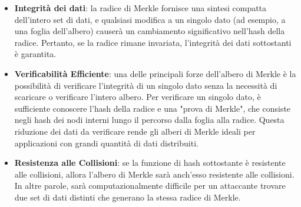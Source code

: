 \begin{itemize}
    \item \textbf{Integrità dei dati}: la radice di Merkle fornisce una sintesi compatta dell'intero set di dati, e qualsiasi modifica a un singolo dato (ad esempio, a una foglia dell'albero) causerà un cambiamento significativo nell'hash della radice. Pertanto, se la radice rimane invariata, l'integrità dei dati sottostanti è garantita.
    \item \textbf{Verificabilità Efficiente}: una delle principali forze dell'albero di Merkle è la possibilità di verificare l'integrità di un singolo dato senza la necessità di scaricare o verificare l'intero albero. Per verificare un singolo dato, è sufficiente conoscere l'hash della radice e una "prova di Merkle", che consiste negli hash dei nodi interni lungo il percorso dalla foglia alla radice. Questa riduzione dei dati da verificare rende gli alberi di Merkle ideali per applicazioni con grandi quantità di dati distribuiti.
    \item \textbf{Resistenza alle Collisioni}: se la funzione di hash sottostante è resistente alle collisioni, allora l'albero di Merkle sarà anch'esso resistente alle collisioni. In altre parole, sarà computazionalmente difficile per un attaccante trovare due set di dati distinti che generano la stessa radice di Merkle.
\end{itemize}